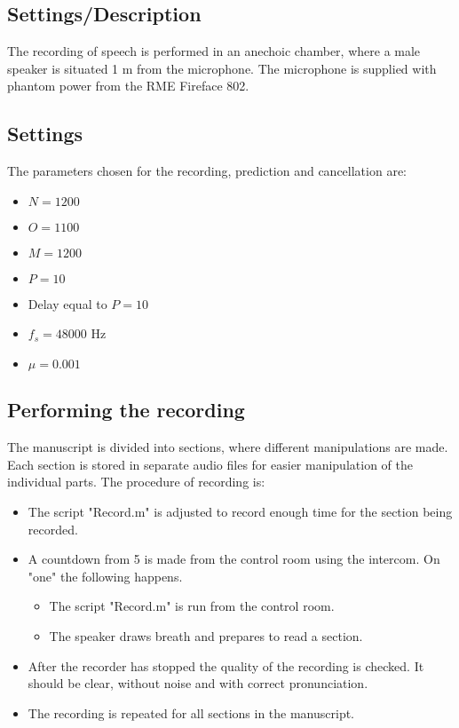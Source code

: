 \subsection{Settings/Description}
The recording of speech is performed in an anechoic chamber, where a male speaker is situated 1 m from the microphone. The microphone is supplied with phantom power from the RME Fireface 802. \\ 

\subsection{Settings}
The parameters chosen for the recording, prediction and cancellation are:
\begin{itemize}
	\item $N=1200$
	\item $O=1100$
	\item $M=1200$
	\item $P=10$
	\item Delay equal to $P=10$
	\item $f_s =48000$ Hz
	\item $\mu=0.001$
\end{itemize}

\subsection{Performing the recording}
The manuscript is divided into sections, where different manipulations are made. Each section is stored in separate audio files for easier manipulation of the individual parts. The procedure of recording is:
\begin{itemize}
	\item The script "Record.m" is adjusted to record enough time for the section being recorded. 
	\item A countdown from 5 is made from the control room using the intercom. On "one" the following happens.
	\begin{itemize}
		\item The script "Record.m" is run from the control room.
		\item The speaker draws breath and prepares to read a section.
	\end{itemize}
	\item After the recorder has stopped the quality of the recording is checked. It should be clear, without noise and with correct pronunciation.
	\item The recording is repeated for all sections in the manuscript.  
\end{itemize}

